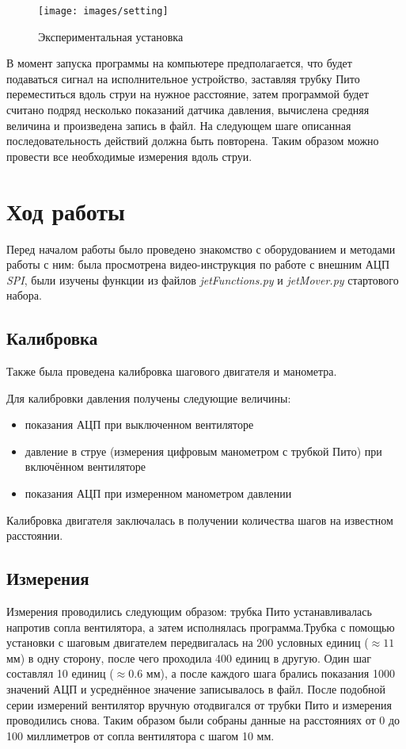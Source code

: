             \begin{figure}
                \centering
                \texttt{[image: images/setting]}
                \caption{Экспериментальная установка}
                \label{fig:setting}
            \end{figure}

            В момент запуска программы на компьютере предполагается, что будет подаваться сигнал на исполнительное устройство, заставляя трубку Пито переместиться вдоль струи на нужное расстояние, затем программой будет считано подряд несколько показаний датчика давления, вычислена средняя величина и произведена запись в файл. На следующем шаге описанная последовательность действий должна быть повторена. Таким образом можно провести все необходимые измерения вдоль струи.

    \section{Ход работы}
        Перед началом работы было проведено знакомство с оборудованием и методами работы с ним: была просмотрена видео-инструкция по работе с внешним АЦП \emph{SPI}, были изучены функции из файлов \emph{jetFunctions.py} и \emph{jetMover.py} стартового набора.

        \subsection*{Калибровка}
            Также была проведена калибровка шагового двигателя и манометра.
            
            Для калибровки давления получены следующие величины: 
            \begin{itemize}
                \item показания АЦП при выключенном вентиляторе
                \item давление в струе (измерения цифровым манометром с трубкой Пито) при включённом вентиляторе
                \item показания АЦП при измеренном манометром давлении
            \end{itemize}
            
            Калибровка двигателя заключалась в получении количества шагов на известном расстоянии.
        
        \subsection*{Измерения}
            Измерения проводились следующим образом: трубка Пито устанавливалась напротив сопла вентилятора, а затем исполнялась программа.Трубка с помощью установки с шаговым двигателем передвигалась на 200 условных единиц ($\approx 11$ мм) в одну сторону, после чего проходила 400 единиц в другую. Один шаг составлял 10 единиц ($\approx 0.6$ мм), а после каждого шага брались показания 1000 значений АЦП и усреднённое значение записывалось в файл. После подобной серии измерений вентилятор вручную отодвигался от трубки Пито и измерения проводились снова. Таким образом были собраны данные на расстояниях от 0 до 100 миллиметров от сопла вентилятора с шагом 10 мм.

